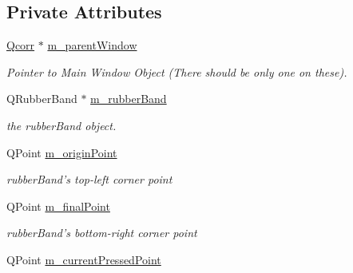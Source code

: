 \subsection*{Private Attributes}
\begin{CompactItemize}
\item 
\hypertarget{classImgLabel_bf77749e36bca018728bde2fc9a974eb}{
\hyperlink{classQcorr}{Qcorr} $\ast$ \hyperlink{classImgLabel_bf77749e36bca018728bde2fc9a974eb}{m\_\-parentWindow}}
\label{classImgLabel_bf77749e36bca018728bde2fc9a974eb}

\begin{CompactList}\small\item\em Pointer to Main Window Object (There should be only one on these). \item\end{CompactList}\item 
\hypertarget{classImgLabel_a62e5311b110d0551158c93c6c90e4cf}{
QRubberBand $\ast$ \hyperlink{classImgLabel_a62e5311b110d0551158c93c6c90e4cf}{m\_\-rubberBand}}
\label{classImgLabel_a62e5311b110d0551158c93c6c90e4cf}

\begin{CompactList}\small\item\em the rubberBand object. \item\end{CompactList}\item 
\hypertarget{classImgLabel_fbbcbd660b7ef7c6048286ac5e350343}{
QPoint \hyperlink{classImgLabel_fbbcbd660b7ef7c6048286ac5e350343}{m\_\-originPoint}}
\label{classImgLabel_fbbcbd660b7ef7c6048286ac5e350343}

\begin{CompactList}\small\item\em rubberBand's top-left corner point \item\end{CompactList}\item 
\hypertarget{classImgLabel_6309ebb41fd14f64eb552e772c3bad25}{
QPoint \hyperlink{classImgLabel_6309ebb41fd14f64eb552e772c3bad25}{m\_\-finalPoint}}
\label{classImgLabel_6309ebb41fd14f64eb552e772c3bad25}

\begin{CompactList}\small\item\em rubberBand's bottom-right corner point \item\end{CompactList}\item 
\hypertarget{classImgLabel_24136f0f97b3f157721c07091a8261ac}{
QPoint \hyperlink{classImgLabel_24136f0f97b3f157721c07091a8261ac}{m\_\-currentPressedPoint}}
\label{classImgLabel_24136f0f97b3f157721c07091a8261ac}


\end{CompactItemize}
